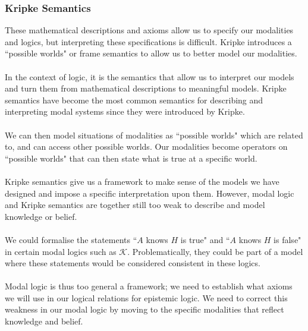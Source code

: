 \documentclass[12pt, a4paper, twoside]{article}
\begin{document}
\subsubsection{Kripke Semantics}\label{epistemic_kripke}
These mathematical descriptions and axioms allow us to specify our modalities
and logics, but interpreting these specifications is difficult.
Kripke introduces a ``possible worlds" or frame semantics to allow us to better
model our modalities.\\
\\
In the context of logic, it is the semantics that allow us to interpret our
models and turn them from mathematical descriptions to meaningful models.
Kripke semantics have become the most common semantics for describing and
interpreting modal systems since they were introduced by Kripke.\\
\\
We can then model situations of modalities as ``possible worlds" which are
related to, and can access other possible worlds.
Our modalities become operators on ``possible worlds" that can then state what
is true at a specific world.\\
\\
Kripke semantics give us a framework to make sense of the models we have
designed and impose a specific interpretation upon them.
However, modal logic and Kripke semantics are together still too weak to
describe and model knowledge or belief.\\
\\
We could formalise the statements ``$A$ knows $H$ is true" and ``$A$ knows $H$
is false" in certain modal logics such as $\mathcal{K}$.
Problematically, they could be part of a model where these statements would be
considered consistent in these logics.\\
\\
Modal logic is thus too general a framework; we need to establish what axioms we
will use in our logical relations for epistemic logic.
We need to correct this weakness in our modal logic by moving to the specific
modalities that reflect knowledge and belief.
\end{document}
